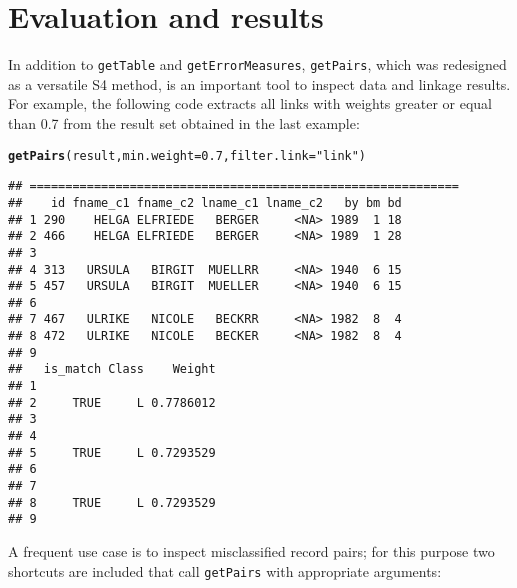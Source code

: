 \documentclass[a4paper]{article}\usepackage[]{graphicx}\usepackage[]{color}
\makeatletter
\newcommand{\hlnum}[1]{\textcolor[rgb]{0.686,0.059,0.569}{#1}}%
\newcommand{\hlstr}[1]{\textcolor[rgb]{0.192,0.494,0.8}{#1}}%
\newcommand{\hlstd}[1]{\textcolor[rgb]{0.345,0.345,0.345}{#1}}%
\newcommand{\hlkwc}[1]{\textcolor[rgb]{0.333,0.667,0.333}{#1}}%
\newcommand{\hlkwd}[1]{\textcolor[rgb]{0.737,0.353,0.396}{\textbf{#1}}}%
\newenvironment{kframe}{%
 \def\at@end@of@kframe{}%
 \ifinner\ifhmode%
  \def\at@end@of@kframe{\end{minipage}}%
  \begin{minipage}{\columnwidth}%
 \fi\fi%
 \def\FrameCommand##1{\hskip\@totalleftmargin \hskip-\fboxsep
 \colorbox{shadecolor}{##1}\hskip-\fboxsep
     \hskip-\linewidth \hskip-\@totalleftmargin \hskip\columnwidth}%
 \MakeFramed {\advance\hsize-\width
   \@totalleftmargin\z@ \linewidth\hsize
   \@setminipage}}%
 {\par\unskip\endMakeFramed%
 \at@end@of@kframe}
\newenvironment{knitrout}{}{} %
\makeatother
\begin{document}
\section{Evaluation and results}

In addition to \texttt{getTable} and \texttt{getErrorMeasures},
\texttt{getPairs}, which was redesigned as a versatile S4 method, is an
important tool to inspect data and linkage results. For example, the following
code extracts all links with weights greater or equal than 0.7 from the result
set obtained in the last example:

\begin{knitrout}
\color{fgcolor}\begin{kframe}
\begin{alltt}
\hlkwd{getPairs}\hlstd{(result,} \hlkwc{min.weight}\hlstd{=}\hlnum{0.7}\hlstd{,} \hlkwc{filter.link}\hlstd{=}\hlstr{"link"}\hlstd{)}
\end{alltt}
\begin{verbatim}
## ============================================================
##    id fname_c1 fname_c2 lname_c1 lname_c2   by bm bd
## 1 290    HELGA ELFRIEDE   BERGER     <NA> 1989  1 18
## 2 466    HELGA ELFRIEDE   BERGER     <NA> 1989  1 28
## 3                                                   
## 4 313   URSULA   BIRGIT  MUELLRR     <NA> 1940  6 15
## 5 457   URSULA   BIRGIT  MUELLER     <NA> 1940  6 15
## 6                                                   
## 7 467   ULRIKE   NICOLE   BECKRR     <NA> 1982  8  4
## 8 472   ULRIKE   NICOLE   BECKER     <NA> 1982  8  4
## 9                                                   
##   is_match Class    Weight
## 1                         
## 2     TRUE     L 0.7786012
## 3                         
## 4                         
## 5     TRUE     L 0.7293529
## 6                         
## 7                         
## 8     TRUE     L 0.7293529
## 9
\end{verbatim}
\end{kframe}
\end{knitrout}

A frequent use case is to inspect misclassified record pairs; for this
purpose two shortcuts are included that call \texttt{getPairs} with
appropriate arguments:
\end{document}

